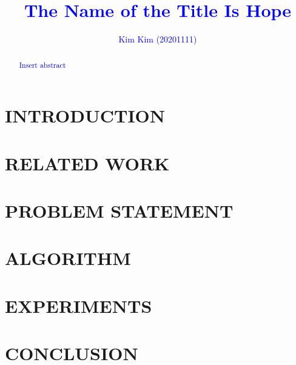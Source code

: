 \documentclass[sigconf]{acmart}
\begin{document}
\title{\textcolor{blue}{The Name of the Title Is Hope}}

\author{\textcolor{blue}{Kim Kim (20201111)}}

\renewcommand{\shortauthors}{\textcolor{blue}{Kim et al.}}

\begin{abstract}
\textcolor{blue}{Insert abstract}
\end{abstract}


\renewcommand\footnotetextcopyrightpermission[1]{} %



\maketitle


\section{INTRODUCTION}
\lipsum[1]

\section{RELATED WORK}
\lipsum[1]

\section{PROBLEM STATEMENT}
\lipsum[1]

\section{ALGORITHM}
\lipsum[1]

\section{EXPERIMENTS}
\lipsum[1]

\section{CONCLUSION}
\lipsum[1]



\end{document}
